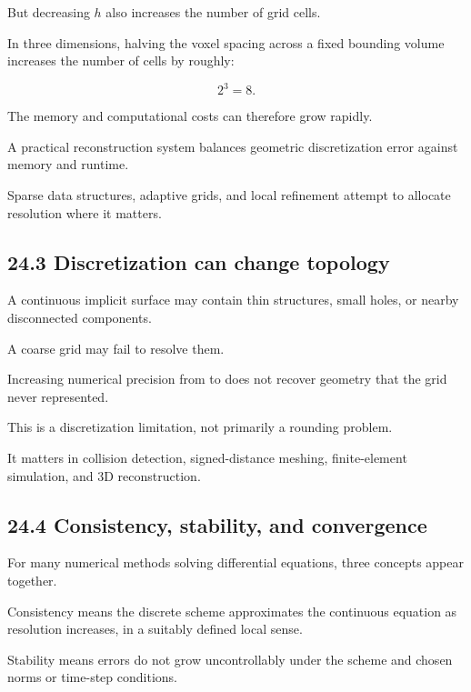 But decreasing \(h\) also increases the number of grid cells.

In three dimensions, halving the voxel spacing across a fixed bounding volume increases the number of cells by roughly:

\[ 2^3=8. \]

The memory and computational costs can therefore grow rapidly.

A practical reconstruction system balances geometric discretization error against memory and runtime.

Sparse data structures, adaptive grids, and local refinement attempt to allocate resolution where it matters.

\subsection{24.3 Discretization can change topology}\label{02-foundations-ii-ch029-discretization-can-change-topology}

\hypertarget{02-foundations-ii-ch029-discretization-can-change-topology}{}

A continuous implicit surface may contain thin structures, small holes, or nearby disconnected components.

A coarse grid may fail to resolve them.

Increasing numerical precision from  to  does not recover geometry that the grid never represented.

This is a discretization limitation, not primarily a rounding problem.

It matters in collision detection, signed-distance meshing, finite-element simulation, and 3D reconstruction.

\subsection{24.4 Consistency, stability, and convergence}\label{02-foundations-ii-ch029-consistency-stability-and-convergence}

\hypertarget{02-foundations-ii-ch029-consistency-stability-and-convergence}{}

For many numerical methods solving differential equations, three concepts appear together.

Consistency means the discrete scheme approximates the continuous equation as resolution increases, in a suitably defined local sense.

Stability means errors do not grow uncontrollably under the scheme and chosen norms or time-step conditions.

